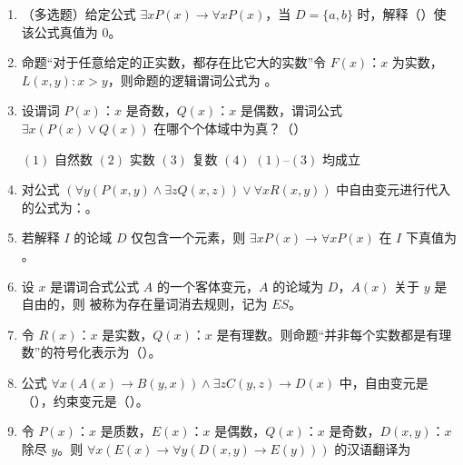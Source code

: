\begin{enumerate}
	\item （多选题）给定公式 \(\exists xP(x)\to \forall xP(x)\)，当 \(D=\{a,b\}\) 时，解释（\quad）使该公式真值为 \(0\)。
	
	
	\item 命题“对于任意给定的正实数，都存在比它大的实数”令 \(F(x)\)：\(x\) 为实数，\(L(x,y):x>y\)，则命题的逻辑谓词公式为 \underline{\hspace{8cm}}。
	
	\item 设谓词 \(P(x)\)：\(x\) 是奇数，\(Q(x)\)：\(x\) 是偶数，谓词公式 \(\exists x(P(x)\vee Q(x))\) 在哪个个体域中为真？（\quad）
	
	\((1)\) 自然数 \quad \((2)\) 实数 \quad \((3)\) 复数 \quad \((4)\) \((1)\)--\((3)\) 均成立
	
	
	\item 对公式 \((\forall y(P(x,y)\land \exists zQ(x,z))\vee \forall xR(x,y))\) 中自由变元进行代入的公式为：\underline{\hspace{1cm}}。
	
	\item 若解释 \(I\) 的论域 \(D\) 仅包含一个元素，则 \(\exists xP(x)\to \forall xP(x)\) 在 \(I\) 下真值为 \underline{\hspace{6cm}}。
	
	\item 设 \(x\) 是谓词合式公式 \(A\) 的一个客体变元，\(A\) 的论域为 \(D\)，\(A(x)\) 关于 \(y\) 是自由的，则 \underline{\hspace{6cm}} 被称为存在量词消去规则，记为 \(ES\)。
	
	\item 令 \(R(x)\)：\(x\) 是实数，\(Q(x)\)：\(x\) 是有理数。则命题“并非每个实数都是有理数”的符号化表示为（\quad）。
	
	
	
	\item 公式 \(\forall x(A(x)\to B(y,x))\land \exists zC(y,z)\to D(x)\) 中，自由变元是（\quad），约束变元是（\quad）。
	
	
	
	\item 令 \(P(x)\)：\(x\) 是质数，\(E(x)\)：\(x\) 是偶数，\(Q(x)\)：\(x\) 是奇数，\(D(x,y)\)：\(x\) 除尽 \(y\)。则 \(\forall x(E(x)\to \forall y(D(x,y)\to E(y)))\) 的汉语翻译为
	

\end{enumerate}
